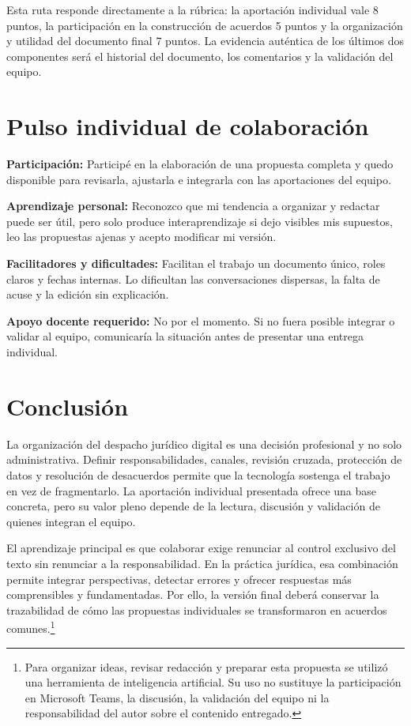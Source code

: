 \documentclass[
  spanish,
  letterpaper, oneside
]{article}
\begin{document}
Esta ruta responde directamente a la rúbrica: la aportación individual vale 8 puntos,
la participación en la construcción de acuerdos 5 puntos y la organización y utilidad
del documento final 7 puntos. La evidencia auténtica de los últimos dos componentes
será el historial del documento, los comentarios y la validación del equipo.

\section{Pulso individual de colaboración}

\textbf{Participación:} Participé en la elaboración de una propuesta completa y quedo
disponible para revisarla, ajustarla e integrarla con las aportaciones del equipo.

\textbf{Aprendizaje personal:} Reconozco que mi tendencia a organizar y redactar puede
ser útil, pero solo produce interaprendizaje si dejo visibles mis supuestos, leo las
propuestas ajenas y acepto modificar mi versión.

\textbf{Facilitadores y dificultades:} Facilitan el trabajo un documento único, roles
claros y fechas internas. Lo dificultan las conversaciones dispersas, la falta de
acuse y la edición sin explicación.

\textbf{Apoyo docente requerido:} No por el momento. Si no fuera posible integrar o
validar al equipo, comunicaría la situación antes de presentar una entrega individual.

\section{Conclusión}

La organización del despacho jurídico digital es una decisión profesional y no solo
administrativa. Definir responsabilidades, canales, revisión cruzada, protección de
datos y resolución de desacuerdos permite que la tecnología sostenga el trabajo en
vez de fragmentarlo. La aportación individual presentada ofrece una base concreta,
pero su valor pleno depende de la lectura, discusión y validación de quienes integran
el equipo.

El aprendizaje principal es que colaborar exige renunciar al control exclusivo del
texto sin renunciar a la responsabilidad. En la práctica jurídica, esa combinación
permite integrar perspectivas, detectar errores y ofrecer respuestas más comprensibles
y fundamentadas. Por ello, la versión final deberá conservar la trazabilidad de cómo
las propuestas individuales se transformaron en acuerdos comunes.\footnote{Para
organizar ideas, revisar redacción y preparar esta propuesta se utilizó una herramienta
de inteligencia artificial. Su uso no sustituye la participación en Microsoft Teams,
la discusión, la validación del equipo ni la responsabilidad del autor sobre el
contenido entregado.}

\clearpage
\nocite{bautista2016didactica,zambranoPilay2020tecnologias,conocer2025ec0554,cushpa2022pacie,pech2016manual,scjn2022protocolo}

\end{document}
